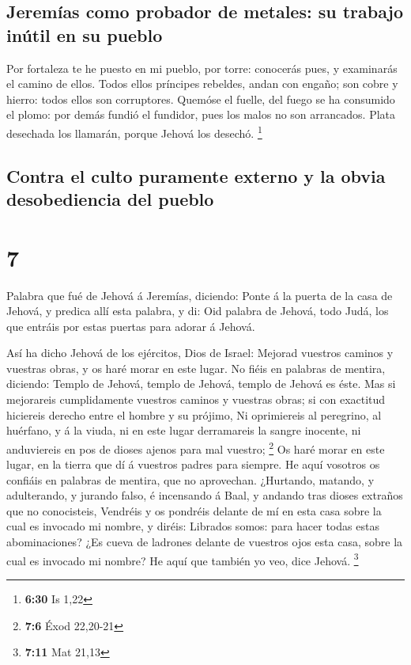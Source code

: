 \hypertarget{jeremuxedas-como-probador-de-metales-su-trabajo-inuxfatil-en-su-pueblo}{%
\subsection{Jeremías como probador de metales: su trabajo inútil en su
pueblo}\label{jeremuxedas-como-probador-de-metales-su-trabajo-inuxfatil-en-su-pueblo}}

 Por fortaleza te he puesto en mi pueblo, por torre:
conocerás pues, y examinarás el camino de ellos.  Todos
ellos príncipes rebeldes, andan con engaño; son cobre y hierro: todos
ellos son corruptores.  Quemóse el fuelle, del fuego se
ha consumido el plomo: por demás fundió el fundidor, pues los malos no
son arrancados.  Plata desechada los llamarán, porque
Jehová los desechó. \footnote{\textbf{6:30} Is 1,22}

\hypertarget{contra-el-culto-puramente-externo-y-la-obvia-desobediencia-del-pueblo}{%
\subsection{Contra el culto puramente externo y la obvia desobediencia
del
pueblo}\label{contra-el-culto-puramente-externo-y-la-obvia-desobediencia-del-pueblo}}

\hypertarget{section-6}{%
\section{7}\label{section-6}}

 Palabra que fué de Jehová á Jeremías, diciendo:
 Ponte á la puerta de la casa de Jehová, y predica allí
esta palabra, y di: Oid palabra de Jehová, todo Judá, los que entráis
por estas puertas para adorar á Jehová.

 Así ha dicho Jehová de los ejércitos, Dios de Israel:
Mejorad vuestros caminos y vuestras obras, y os haré morar en este
lugar.  No fiéis en palabras de mentira, diciendo: Templo
de Jehová, templo de Jehová, templo de Jehová es éste. 
Mas si mejorareis cumplidamente vuestros caminos y vuestras obras; si
con exactitud hiciereis derecho entre el hombre y su prójimo,
 Ni oprimiereis al peregrino, al huérfano, y á la viuda,
ni en este lugar derramareis la sangre inocente, ni anduviereis en pos
de dioses ajenos para mal vuestro; \footnote{\textbf{7:6} Éxod 22,20-21}
 Os haré morar en este lugar, en la tierra que dí á
vuestros padres para siempre.  He aquí vosotros os
confiáis en palabras de mentira, que no aprovechan. 
¿Hurtando, matando, y adulterando, y jurando falso, é incensando á Baal,
y andando tras dioses extraños que no conocisteis, 
Vendréis y os pondréis delante de mí en esta casa sobre la cual es
invocado mi nombre, y diréis: Librados somos: para hacer todas estas
abominaciones?  ¿Es cueva de ladrones delante de vuestros
ojos esta casa, sobre la cual es invocado mi nombre? He aquí que también
yo veo, dice Jehová. \footnote{\textbf{7:11} Mat 21,13}

